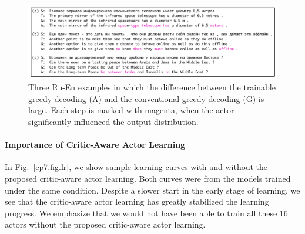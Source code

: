 \begin{figure}[hptb]
\centering
\begin{minipage}{\textwidth}
\includegraphics[width=\columnwidth]{figs/trainable/example.pdf}
\caption{\label{cp7.fig.exp}   Three Ru-En examples in which the difference between the trainable greedy decoding (A) and the conventional greedy decoding (G) is large. Each step is marked with magenta, when the actor significantly influenced the output distribution.} 
\end{minipage}
\end{figure} 

\paragraph{Importance of Critic-Aware Actor Learning}
In Fig.~\ref{cp7.fig.lr}, we show sample learning curves with and without the proposed critic-aware actor learning. Both curves were from the models trained under the same condition. Despite a slower start in the early stage of learning, we see that the critic-aware actor learning has greatly stabilized the learning progress. We emphasize that we would not have been able to train all these 16 actors without the proposed critic-aware actor learning.

